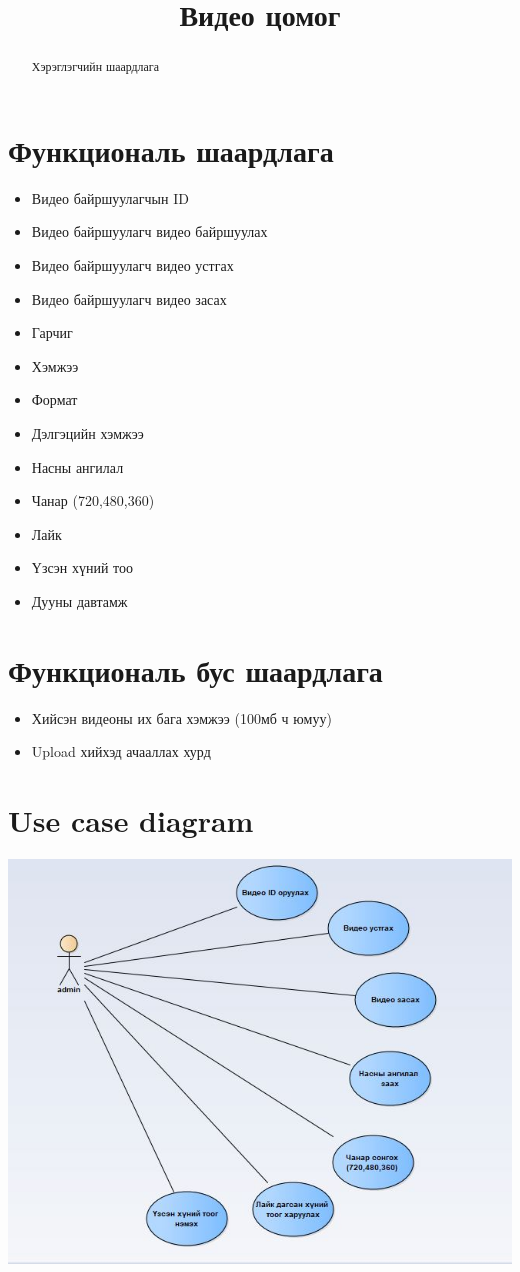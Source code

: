 \documentclass[12pt]{article}
\title{Видео цомог}
\begin{document}
	\maketitle
	\begin{abstract}
		Хэрэглэгчийн шаардлага
	\end{abstract}

	\section{Функциональ шаардлага}
	\begin{itemize}
		\item Видео байршуулагчын ID 
		\item Видео байршуулагч видео байршуулах 
		\item Видео байршуулагч видео устгах
		\item Видео байршуулагч видео засах
		
		\item Гарчиг
		\item Хэмжээ
		\item Формат 
		\item Дэлгэцийн хэмжээ
		\item Насны ангилал
		\item Чанар (720,480,360)
		\item Лайк
		\item Үзсэн хүний тоо
		\item Дууны давтамж
	\end{itemize}
	
	\section{Функциональ бус шаардлага}	
	\begin{itemize}
		\item Хийсэн видеоны их бага  хэмжээ (100мб ч юмуу)
		\item Upload хийхэд ачааллах хурд

	\end{itemize}
	\section{Use case diagram}	
\includegraphics[scale=0.80]{images/usecase.jpg}
\end{document}
